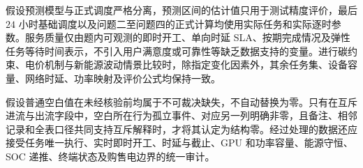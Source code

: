 假设预测模型与正式调度严格分离，预测区间的估计值只用于测试精度评价，最后 $24$ 小时基础调度以及问题二至问题四的正式计算均使用实际任务和实际逐时参数。服务质量仅由题内可观测的即时开工、单向时延 SLA、按期完成情况及弹性任务等待时间表示，不引入用户满意度或可靠性等缺乏数据支持的变量。进行碳约束、电价机制与新能源波动情景比较时，除指定变化因素外，其余任务集、设备容量、网络时延、功率映射及评价公式均保持一致。

假设普通空白值在未经核验前均属于不可裁决缺失，不自动替换为零。只有在互斥进流与出流字段中，空白所在行为孤立事件、对应另一列明确非零，且备注、相邻记录和全表口径共同支持互斥解释时，才将其认定为结构零。经过处理的数据还应接受任务唯一执行、实时即时开工、时延与截止、GPU 和功率容量、能源守恒、SOC 递推、终端状态及购售电边界的统一审计。
